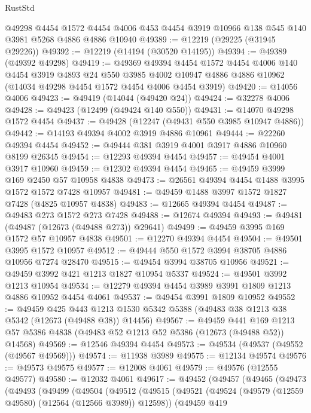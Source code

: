 \begin{lexlean}{RustStd}
\begin{coremodule}
{\begin{coremodule}
{{{{{{{{{{{{{{{{{{{{{{{{{{{{{{{{{{{{{{{{{{{{{{{{{{{{{{{{{{{{{{{{{{{{{{{{{{{{{{{{    @49298
    @4454
    @1572
    @4454
    @4006
    @453
    @4454
    @3919
    @10966
    @138
    @545
    @140
    @3981
    @5268
    @4886
    @4886
    @10940
@49389 := @12219 (@29225 (@31945 @29226))
@49392 := @12219 (@14194 (@30520 @14195))
@49394 := @49389 (@49392 @49298)
@49419 := @49369
    @49394
    @4454
    @1572
    @4454
    @4006
    @140
    @4454
    @3919
    @4893
    @24
    @550
    @3985
    @4002
    @10947
    @4886
    @4886
    @10962
    (@14034 @49298 @4454 @1572 @4454 @4006 @4454 @3919)
@49420 := @14056 @4006
@49423 := @49419 (@14044 (@49420 @24))
@49424 := @32278 @4006
@49428 := @49423 (@12499 (@49424 @140 @550))
@49431 := @14070 @49298 @1572 @4454
@49437 := @49428 (@12247 (@49431 @550 @3985 @10947 @4886))
@49442 := @14193 @49394 @4002 @3919 @4886 @10961
@49444 := @22260 @49394 @4454
@49452 := @49444 @381 @3919 @4001 @3917 @4886 @10960 @8199 @26345
@49454 := @12293 @49394 @4454
@49457 := @49454 @4001 @3917 @10960
@49459 := @12302 @49394 @4454
@49465 := @49459 @3999 @169 @2450 @57 @10958 @4838
@49473 := @26561 @49394 @4454 @1488 @3995 @1572 @1572 @7428 @10957
@49481 := @49459 @1488 @3997 @1572 @1827 @7428 (@4825 @10957 @4838)
@49483 := @12665 @49394 @4454
@49487 := @49483 @273 @1572 @273 @7428
@49488 := @12674 @49394
@49493 := @49481 (@49487 (@12673 (@49488 @273)) @29641)
@49499 := @49459 @3995 @169 @1572 @57 @10957 @4838
@49501 := @12270 @49394 @4454
@49504 := @49501 @3995 @1572 @10957
@49512 := @49444 @550 @1572 @3994 @38705 @4886 @10956 @7274 @28470
@49515 := @49454 @3994 @38705 @10956
@49521 := @49459 @3992 @421 @1213 @1827 @10954 @5337
@49524 := @49501 @3992 @1213 @10954
@49534 := @12279 @49394 @4454 @3989 @3991 @1809 @1213 @4886 @10952 @4454 @4061
@49537 := @49454 @3991 @1809 @10952
@49552 := @49459
    @425
    @443
    @1213
    @1530
    @5342
    @5388
    (@49483 @38 @1213 @38 @5342 (@12673 (@49488 @38)) @14456)
@49567 := @49459
    @441
    @169
    @1213
    @57
    @5386
    @4838
    (@49483 @52 @1213 @52 @5386 (@12673 (@49488 @52)) @14568)
@49569 := @12546 @49394 @4454
@49573 := @49534 (@49537 (@49552 (@49567 @49569)))
@49574 := @11938 @3989
@49575 := @12134 @49574
@49576 := @49573 @49575
@49577 := @12008 @4061
@49579 := @49576 (@12555 @49577)
@49580 := @12032 @4061
@49617 := @49452
    (@49457
      (@49465
        (@49473
          (@49493
            (@49499
              (@49504
                (@49512
                  (@49515
                    (@49521
                      (@49524 (@49579 (@12559 @49580) (@12564 (@12566 @3989)) @12598))
                      (@49459
                        @419
}}}}}}}}}}}}}}}}}}}}}}}}}}}}}}}}}}}}}}}}}}}}}}}}}}}}}}}}}}}}}}}}}}}}}}}}}}}}}}}}
\end{coremodule}}
\end{coremodule}
\end{lexlean}
